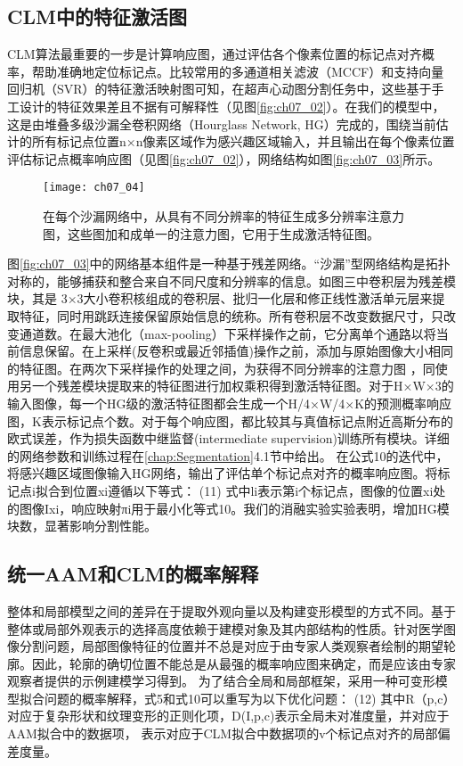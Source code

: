 \subsection{CLM中的特征激活图}
CLM算法最重要的一步是计算响应图，通过评估各个像素位置的标记点对齐概率，帮助准确地定位标记点。比较常用的多通道相关滤波（MCCF）\citep{Galoogahi2016}和支持向量回归机（SVR）\citep{Jan2017}的特征激活映射图可知，在超声心动图分割任务中，这些基于手工设计的特征效果差且不据有可解释性（见图\ref{fig:ch07_02}）。在我们的模型中，这是由堆叠多级沙漏全卷积网络（Hourglass Network, HG）\citep{Newell2016a}完成的，围绕当前估计的所有标记点位置n×n像素区域作为感兴趣区域输入，并且输出在每个像素位置评估标记点概率响应图（见图\ref{fig:ch07_02}），网络结构如图\ref{fig:ch07_03}所示。 
\begin{figure}[!htbp]
\centering
\texttt{[image: ch07\_04]}
\caption{在每个沙漏网络中，从具有不同分辨率的特征生成多分辨率注意力图，这些图加和成单一的注意力图，它用于生成激活特征图。}
\label{fig:ch07_04}
\end{figure} 
 

图\ref{fig:ch07_03}中的网络基本组件是一种基于残差网络\citep{he15}。“沙漏”型网络结构是拓扑对称的，能够捕获和整合来自不同尺度和分辨率的信息。如图三中卷积层为残差模块，其是 3×3大小卷积核组成的卷积层、批归一化层和修正线性激活单元层来提取特征，同时用跳跃连接保留原始信息的统称。所有卷积层不改变数据尺寸，只改变通道数。在最大池化（max-pooling）下采样操作之前，它分离单个通路以将当前信息保留。在上采样(反卷积或最近邻插值)操作之前，添加与原始图像大小相同的特征图。在两次下采样操作的处理之间，为获得不同分辨率的注意力图\citep{Chu2017} ，同使用另一个残差模块提取来的特征图进行加权乘积得到激活特征图。对于H×W×3的输入图像，每一个HG级的激活特征图都会生成一个H/4×W/4×K的预测概率响应图，K表示标记点个数。对于每个响应图，都比较其与真值标记点附近高斯分布的欧式误差，作为损失函数中继监督(intermediate supervision)训练所有模块。详细的网络参数和训练过程在\ref{chap:Segmentation}4.1节中给出。
在公式10的迭代中，将感兴趣区域图像输入HG网络，输出了评估单个标记点对齐的概率响应图。将标记点i拟合到位置xi遵循以下等式： 
	  	(11)
式中li表示第i个标记点，图像的位置xi处的图像Ixi，响应映射πi用于最小化等式10。我们的消融实验实验表明，增加HG模块数，显著影响分割性能。

\subsection{统一AAM和CLM的概率解释}
整体和局部模型之间的差异在于提取外观向量以及构建变形模型的方式不同。基于整体或局部外观表示的选择高度依赖于建模对象及其内部结构的性质。针对医学图像分割问题，局部图像特征的位置并不总是对应于由专家人类观察者绘制的期望轮廓。因此，轮廓的确切位置不能总是从最强的概率响应图来确定，而是应该由专家观察者提供的示例建模学习得到。
为了结合全局和局部框架，采用一种可变形模型拟合问题的概率解释，式5和式10可以重写为以下优化问题：
    (12)
其中R（p,c）对应于复杂形状和纹理变形的正则化项，D(I,p,c)表示全局未对准度量，并对应于AAM拟合中的数据项， 表示对应于CLM拟合中数据项的v个标记点对齐的局部偏差度量。

